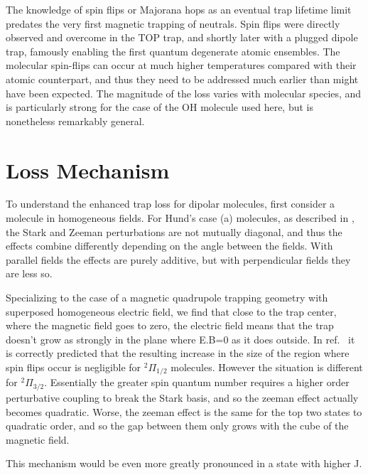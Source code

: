 \documentclass[%
 reprint,
 amsmath,amssymb,
 aps,
prl,
]{revtex4-1}
\begin{document}
The knowledge of spin flips or Majorana hops as an eventual trap lifetime limit predates the very first magnetic trapping of neutrals\cite{Migdall1985}. Spin flips were directly observed and overcome in the TOP trap\cite{Petrich1995}, and shortly later with a plugged dipole trap\cite{Davis1995}, famously enabling the first quantum degenerate atomic ensembles. The molecular spin-flips can occur at much higher temperatures compared with their atomic counterpart, and thus they need to be addressed much earlier than might have been expected. The magnitude of the loss varies with molecular species, and is particularly strong for the case of the OH molecule used here, but is nonetheless remarkably general.


\section{Loss Mechanism  \label{sec:lm} }
To understand the enhanced trap loss for dipolar molecules, first consider a molecule in homogeneous fields. For Hund's case (a) molecules, as described in \cite{Lara2008}, the Stark and Zeeman perturbations are not mutually diagonal, and thus the effects combine differently depending on the angle between the fields. With parallel fields the effects are purely additive, but with perpendicular fields they are less so.

Specializing to the case of a magnetic quadrupole trapping geometry with superposed homogeneous electric field, we find that close to the trap center, where the magnetic field goes to zero, the electric field means that the trap doesn't grow as strongly in the plane where E.B=0 as it does outside. In ref.~\cite{Lara2008} it is correctly predicted that the resulting increase in the size of the region where spin flips occur is negligible for $^2\Pi_{1/2}$ molecules. However the situation is different for $^2\Pi_{3/2}$. Essentially the greater spin quantum number requires a higher order perturbative coupling to break the Stark basis, and so the zeeman effect actually becomes quadratic. Worse, the zeeman effect is the same for the top two states to quadratic order, and so the gap between them only grows with the cube of the magnetic field.

This mechanism would be even more greatly pronounced in a state with higher J.
 
\end{document}
